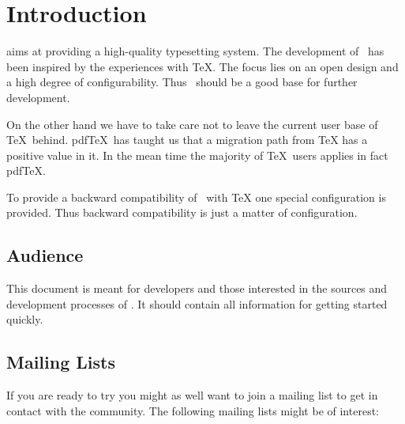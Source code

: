 \chapter{Introduction}

\ExTeX{} aims at providing a high-quality typesetting system. The
development of \ExTeX\ has been inspired by the experiences with \TeX.
The focus lies on an open design and a high degree of configurability.
Thus \ExTeX\ should be a good base for further development.

On the other hand we have to take care not to leave the current user
base of \TeX\ behind. pdf\TeX\ has taught us that a migration path
from \TeX{} has a positive value in it. In the mean time
the majority of \TeX\ users applies in fact
pdf\TeX{}.

To provide a backward compatibility of \ExTeX\ with
\TeX{} one special configuration is provided. Thus
backward compatibility is just a matter of configuration.


\section{Audience}

This document is meant for developers and those interested in the
sources and development processes of \ExTeX. It should contain all
information for getting started quickly.


\section{Mailing Lists}

If you are ready to try \ExTeX{} you might as well want to join a
mailing list to get in contact with the community. The following
mailing lists might be of interest:

